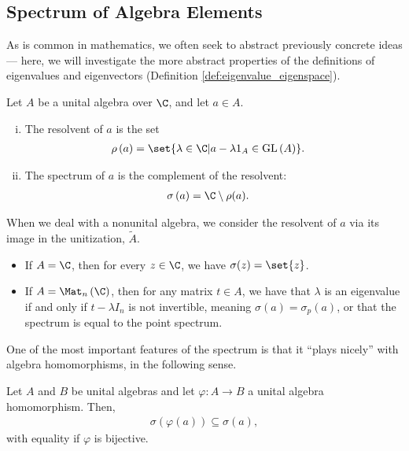\subsection{Spectrum of Algebra Elements}%
As is common in mathematics, we often seek to abstract previously concrete ideas --- here, we will investigate the more abstract properties of the definitions of eigenvalues and eigenvectors (Definition \ref{def:eigenvalue_eigenspace}).
\begin{definition}\label{def:spectrum}
  Let $A$ be a unital algebra over $\C$, and let $a\in A$.
  \begin{enumerate}[(i)]
    \item The resolvent of $a$ is the set
      \begin{align*}
        \rho\left( a \right) &= \set{\lambda\in \C | a -\lambda 1_A \in \text{GL}\left( A \right)}.
      \end{align*}
    \item The spectrum of $a$ is the complement of the resolvent:
      \begin{align*}
        \sigma\left( a \right) &= \C\setminus \rho(a).
      \end{align*}
  \end{enumerate}
\end{definition}
\begin{remark}
  When we deal with a nonunital algebra, we consider the resolvent of $a$ via its image in the unitization, $\widetilde{A}$. 
\end{remark}
\begin{example}\hfill
  \begin{itemize}
    \item If $A = \C$, then for every $z\in \C$, we have $\sigma(z) = \set{z}$.
    \item If $A = \Mat_n\left( \C \right)$, then for any matrix $t\in A$, we have that $\lambda$ is an eigenvalue if and only if $t -\lambda I_n$ is not invertible, meaning $\sigma\left( a \right) = \sigma_p\left( a \right)$, or that the spectrum is equal to the point spectrum.
  \end{itemize}
\end{example}
One of the most important features of the spectrum is that it ``plays nicely'' with algebra homomorphisms, in the following sense.
\begin{proposition}
  Let $A$ and $B$ be unital algebras and let $\varphi\colon A\rightarrow B$ a unital algebra homomorphism. Then,
  \begin{align*}
    \sigma\left( \varphi\left( a \right) \right) \subseteq \sigma\left( a \right),
  \end{align*}
  with equality if $\varphi$ is bijective.
\end{proposition}
